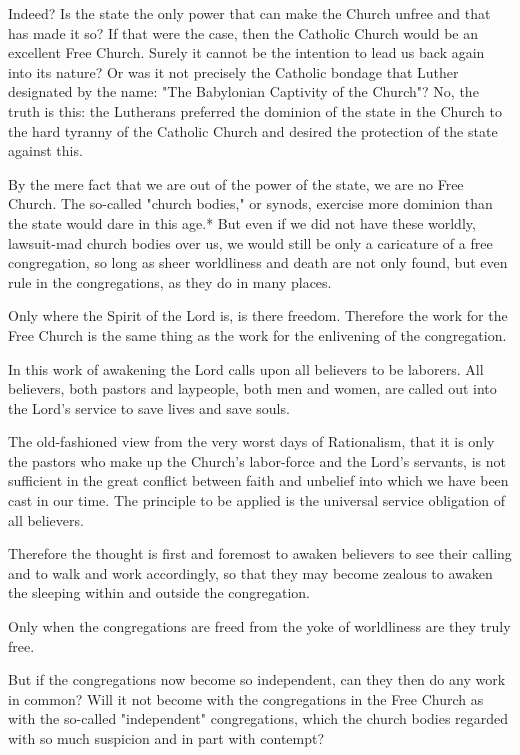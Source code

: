 Indeed? Is the state the only power that can make the Church unfree and that has made it so? If that were the case, then the Catholic Church would be an excellent Free Church. Surely it cannot be the intention to lead us back again into its nature? Or was it not precisely the Catholic bondage that Luther designated by the name: "The Babylonian Captivity of the Church"? No, the truth is this: the Lutherans preferred the dominion of the state in the Church to the hard tyranny of the Catholic Church and desired the protection of the state against this.

By the mere fact that we are out of the power of the state, we are no Free Church. The so-called "church bodies," or synods, exercise more dominion than the state would dare in this age.* But even if we did not have these worldly, lawsuit-mad church bodies over us, we would still be only a caricature of a free congregation, so long as sheer worldliness and death are not only found, but even rule in the congregations, as they do in many places.

Only where the Spirit of the Lord is, is there freedom. Therefore the work for the Free Church is the same thing as the work for the enlivening of the congregation.

In this work of awakening the Lord calls upon all believers to be laborers. All believers, both pastors and laypeople, both men and women, are called out into the Lord’s service to save lives and save souls.

The old-fashioned view from the very worst days of Rationalism, that it is only the pastors who make up the Church’s labor-force and the Lord’s servants, is not sufficient in the great conflict between faith and unbelief into which we have been cast in our time. The principle to be applied is the universal service obligation of all believers.

Therefore the thought is first and foremost to awaken believers to see their calling and to walk and work accordingly, so that they may become zealous to awaken the sleeping within and outside the congregation.

Only when the congregations are freed from the yoke of worldliness are they truly free.

But if the congregations now become so independent, can they then do any work in common? Will it not become with the congregations in the Free Church as with the so-called "independent" congregations, which the church bodies regarded with so much suspicion and in part with contempt?

